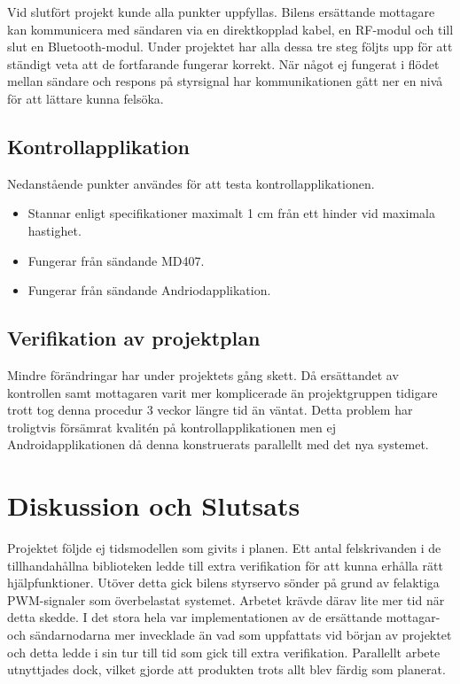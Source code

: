 \documentclass[a4paper]{article}
\begin{document}
\noindent
Vid slutfört projekt kunde alla punkter uppfyllas. Bilens ersättande mottagare kan kommunicera med sändaren via en direktkopplad kabel, en RF-modul och till slut en Bluetooth-modul. Under projektet har alla dessa tre steg följts upp för att ständigt veta att de fortfarande fungerar korrekt. När något ej fungerat i flödet mellan sändare och respons på styrsignal har kommunikationen gått ner en nivå för att lättare kunna felsöka.

\subsection{Kontrollapplikation}
Nedanstående punkter användes för att testa kontrollapplikationen.

\begin{itemize}
\item Stannar enligt specifikationer maximalt 1 cm från ett hinder vid maximala hastighet.
\item Fungerar från sändande MD407.
\item Fungerar från sändande Andriodapplikation.
\end{itemize}



\subsection{Verifikation av projektplan}
Mindre förändringar har under projektets gång skett. Då ersättandet av kontrollen samt mottagaren varit mer komplicerade än projektgruppen tidigare trott tog denna procedur 3 veckor längre tid än väntat. Detta problem har troligtvis försämrat kvalitén på kontrollapplikationen men ej Androidapplikationen då denna konstruerats parallellt med det nya systemet.



\newpage
\section{Diskussion och Slutsats}

Projektet följde ej tidsmodellen som givits i planen. Ett antal felskrivanden i de tillhandahållna biblioteken ledde till extra verifikation för att kunna erhålla rätt hjälpfunktioner. Utöver detta gick bilens styrservo sönder på grund av felaktiga PWM-signaler som överbelastat systemet. Arbetet krävde därav lite mer tid när detta skedde. I det stora hela var implementationen av de ersättande mottagar- och sändarnodarna mer invecklade än vad som uppfattats vid början av projektet och detta ledde i sin tur till tid som gick till extra verifikation. Parallellt arbete utnyttjades dock, vilket gjorde att produkten trots allt blev färdig som planerat.
\end{document}
